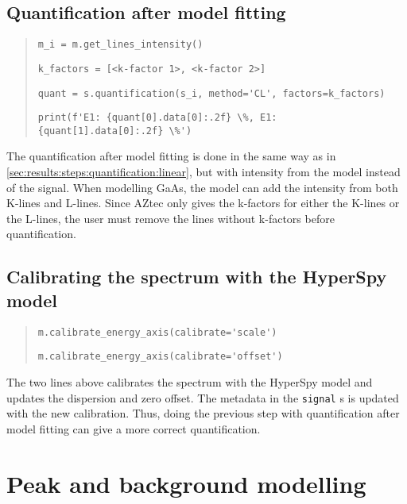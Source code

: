 \subsection{Quantification after model fitting}
\label{sec:results:steps:quantification:model}

\begin{quote}
    \verb|m_i = m.get_lines_intensity()|

    \verb|k_factors = [<k-factor 1>, <k-factor 2>] |

    \verb|quant = s.quantification(s_i, method='CL', factors=k_factors)|

    \verb|print(f'E1: {quant[0].data[0]:.2f} \%, E1: {quant[1].data[0]:.2f} \%')|

\end{quote}

The quantification after model fitting is done in the same way as in \cref{sec:results:steps:quantification:linear}, but with intensity from the model instead of the signal.
When modelling GaAs, the model can add the intensity from both K-lines and L-lines.
Since AZtec only gives the k-factors for either the K-lines or the L-lines, the user must remove the lines without k-factors before quantification.


\subsection{Calibrating the spectrum with the HyperSpy model}
\label{sec:results:steps:HyperSpycalibration}

\begin{quote}

    \verb|m.calibrate_energy_axis(calibrate='scale')|

    \verb|m.calibrate_energy_axis(calibrate='offset')|

\end{quote}

The two lines above calibrates the spectrum with the HyperSpy model and updates the dispersion and zero offset.
The metadata in the \verb|signal| s is updated with the new calibration.
Thus, doing the previous step with quantification after model fitting can give a more correct quantification.
%
%
%

%
%
\section{Peak and background modelling}
\label{sec:results:modelling}

